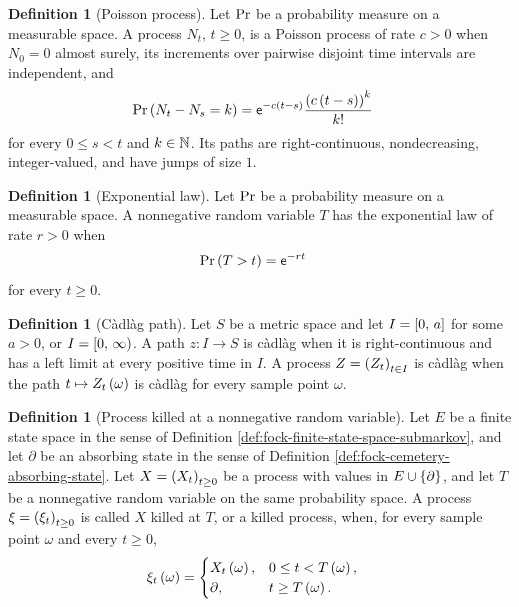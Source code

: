 \documentclass[11pt,a4paper]{article}
\theoremstyle{plain}
\theoremstyle{definition}
\newtheorem{defn}[thm]{Definition}
\theoremstyle{remark}
\begin{document}
\begin{defn}[Poisson process]
Let $\mathrm{Pr}$ be a probability measure on a measurable space.
A process $N_t$, $t\geq0$, is a Poisson process of rate $c>0$ when $N_0=0$ almost surely, its increments over
pairwise disjoint time intervals are independent, and
$$\begin{aligned}
\mathrm{Pr} \left( N_t-N_s=k \right)
& =
\mathsf{e}^{-c\left( t-s \right)}
\frac{\left( c\left( t-s \right) \right)^{k}}{k!}
\end{aligned}$$
for every $0\leq s<t$ and $k\in\mathbb{N}$.
Its paths are right-continuous, nondecreasing, integer-valued, and have jumps of size $1$.
\end{defn}

\begin{defn}[Exponential law]\label{def:fock-exponential-law}
Let $\mathrm{Pr}$ be a probability measure on a measurable space.
A nonnegative random variable $T$ has the exponential law of rate $r>0$ when
$$\begin{aligned}
\mathrm{Pr} \left( T>t \right)
& =
\mathsf{e}^{-rt}
\end{aligned}$$
for every $t\geq0$.
\end{defn}

\begin{defn}[Càdlàg path]\label{def:fock-cadlag-path}
Let $S$ be a metric space and let $I=\left[ 0,\,a \right]$ for some $a>0$, or
$I=\left[0, \, \infty \right)$.
A path $z\colon I\to S$ is càdlàg when it is right-continuous and has a left limit at every positive time in
$I$.
A process $Z=\seq{Z_t}{t\in I}$ is càdlàg when the path
$t\mapsto Z_t \left( \omega \right)$ is càdlàg for every sample point $\omega$.
\end{defn}

\begin{defn}[Process killed at a nonnegative random variable]\label{def:fock-killed-process}
Let $E$ be a finite state space in the sense of
Definition \ref{def:fock-finite-state-space-submarkov}, and let $\partial$ be an absorbing state in the sense of
Definition \ref{def:fock-cemetery-absorbing-state}.
Let $X=\seq{X_t}{t\geq0}$ be a process with values in $E\cup\left\{ \partial \right\}$, and let $T$ be a nonnegative
random variable on the same probability space.
A process $\xi=\seq{\xi_t}{t\geq0}$ is called $X$ killed at $T$, or a killed process, when, for every sample point
$\omega$ and every $t\geq0$,
$$\begin{aligned}
\xi_t \left( \omega \right)
& =
\begin{cases}
X_t \left( \omega \right),
&
0\leq t<T \left( \omega \right),
\\
\partial,
&
t\geq T \left( \omega \right).
\end{cases}
\end{aligned}$$
\end{defn}
\end{document}
